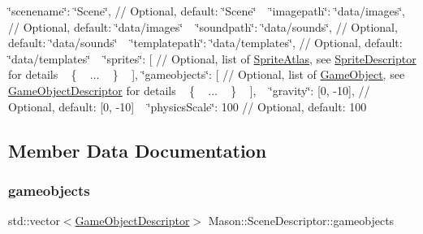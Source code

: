 \char`\"{}scenename\char`\"{}\+: \char`\"{}\+Scene\char`\"{}, // Optional, default\+: \char`\"{}\+Scene\char`\"{} ~\newline
 \char`\"{}imagepath\char`\"{}\+: \char`\"{}data/images\char`\"{}, // Optional, default\+: \char`\"{}data/images\char`\"{} ~\newline
 \char`\"{}soundpath\char`\"{}\+: \char`\"{}data/sounds\char`\"{}, // Optional, default\+: \char`\"{}data/sounds\char`\"{} ~\newline
 \char`\"{}templatepath\char`\"{}\+: \char`\"{}data/templates\char`\"{}, // Optional, default\+: \char`\"{}data/templates\char`\"{} ~\newline
 \char`\"{}sprites\char`\"{}\+: \mbox{[} // Optional, list of \hyperlink{class_mason_1_1_sprite_atlas}{Sprite\+Atlas}, see \hyperlink{class_mason_1_1_sprite_descriptor}{Sprite\+Descriptor} for details ~\newline
 \{ ~\newline
 ... ~\newline
 \} ~\newline
 \mbox{]}, \char`\"{}gameobjects\char`\"{}\+: \mbox{[} // Optional, list of \hyperlink{class_mason_1_1_game_object}{Game\+Object}, see \hyperlink{class_mason_1_1_game_object_descriptor}{Game\+Object\+Descriptor} for details ~\newline
 \{ ~\newline
 ... ~\newline
 \} ~\newline
 \mbox{]}, ~\newline
 \char`\"{}gravity\char`\"{}\+: \mbox{[}0, -\/10\mbox{]}, // Optional, default\+: \mbox{[}0, -\/10\mbox{]} ~\newline
 \char`\"{}physics\+Scale\char`\"{}\+: 100 // Optional, default\+: 100 ~\newline
 

\subsection{Member Data Documentation}
\hypertarget{class_mason_1_1_scene_descriptor_a1883e270cf9361e9797269cc0bed1bbc}{}\label{class_mason_1_1_scene_descriptor_a1883e270cf9361e9797269cc0bed1bbc} 
\subsubsection{\texorpdfstring{gameobjects}{gameobjects}}
{\footnotesize\ttfamily std\+::vector$<$\hyperlink{class_mason_1_1_game_object_descriptor}{Game\+Object\+Descriptor}$>$ Mason\+::\+Scene\+Descriptor\+::gameobjects}

